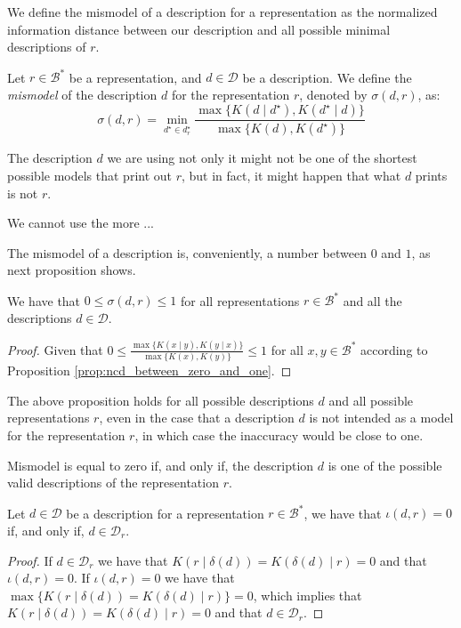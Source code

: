 We define the mismodel of a description for a representation as the normalized information distance between our description and all possible minimal descriptions of $r$.

\begin{definition} [Mismodel]
\label{def:mismodel}
Let $r \in \mathcal{B}^\ast$ be a representation, and $d \in \mathcal{D}$ be a description. We define the \emph{mismodel} of the description $d$ for the representation $r$, denoted by $\sigma(d, r)$, as:
\[
\sigma (d, r) = { \underset{ d^\star \in d^\star_r } \min} \frac{ \max\{ K \left( d \mid d^\star \right), K \left( d^\star \mid d \right) \} } { \max\{ K \left( d \right), K \left( d^\star \right) \} }
\]
\end{definition}

The description $d$ we are using not only it might not be one of the shortest possible models that print out $r$, but in fact, it might happen that what $d$ prints is not $r$.

We cannot use the more ...

The mismodel of a description is, conveniently, a number between $0$ and $1$, as next proposition shows.

\begin{proposition}
We have that $0 \leq \sigma(d, r) \leq 1$ for all representations $r \in \mathcal{B}^\ast$ and all the descriptions $d \in \mathcal{D}$.
\end{proposition}
\begin{proof}
Given that $0 \leq \frac{ \max\{ K(x \mid y), K(y \mid x) \} } { \max\{ K(x), K(y) \} } \leq 1$ for all $x, y \in \mathcal{B}^\ast$ according to Proposition \ref{prop:ncd_between_zero_and_one}.
\end{proof}

{\color{red} The above proposition holds for all possible descriptions $d$ and all possible representations $r$, even in the case that a description $d$ is not intended as a model for the representation $r$, in which case the inaccuracy would be close to one.}

Mismodel is equal to zero if, and only if, the description $d$ is one of the possible valid descriptions of the representation $r$.

\begin{proposition}
Let $d \in \mathcal{D}$ be a description for a representation $r \in \mathcal{B}^\ast$, we have that $\iota(d, r) = 0$ if, and only if, $d \in \mathcal{D}_r$.
\end{proposition}
\begin{proof}
If $d \in \mathcal{D}_r$ we have that $K \left( r \mid \delta(d) \right) = K \left( \delta(d) \mid r \right) = 0$ and that $\iota(d, r) = 0$. If $\iota(d, r) = 0$ we have that $\max\{ K \left( r \mid \delta(d) \right) = K \left( \delta(d) \mid r \right) \} = 0$, which implies that $K \left( r \mid \delta(d) \right) = K \left( \delta(d) \mid r \right) = 0$ and that $d \in \mathcal{D}_r$.
\end{proof}

